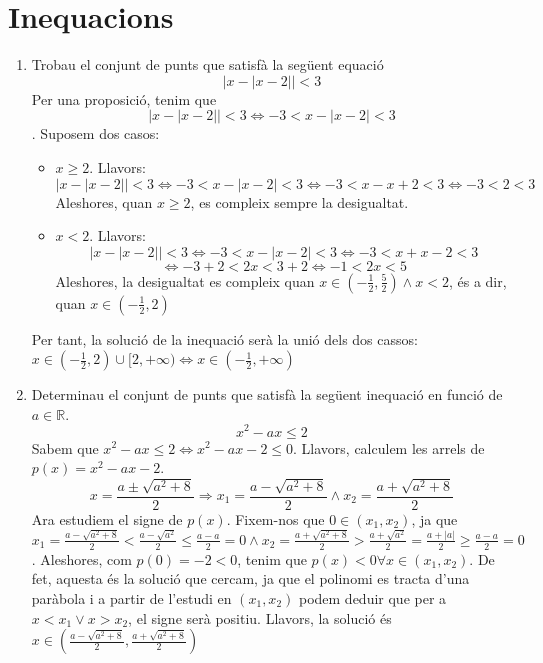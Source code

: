 
\section{Inequacions}
\begin{enumerate}
\item Trobau el conjunt de punts que satisfà la següent equació \begin{equation}
|x - |x-2|| < 3
\end{equation}
Per una proposició, tenim que $$|x - |x-2|| < 3 \Leftrightarrow - 3 < x - |x-2| < 3$$. Suposem dos casos:
\begin{itemize}
\item $x \geq 2$. Llavors: $$|x - |x-2|| < 3 \Leftrightarrow - 3 < x - |x-2| < 3 \Leftrightarrow - 3 < x - x + 2 < 3 \Leftrightarrow - 3 < 2 < 3$$ 
Aleshores, quan $x \geq 2$, es compleix sempre la desigualtat.
\item $x < 2$. Llavors: $$|x - |x-2|| < 3 \Leftrightarrow - 3 < x - |x-2| < 3 \Leftrightarrow - 3 < x +  x - 2 < 3 $$$$ \Leftrightarrow - 3 + 2 < 2x < 3 + 2 \Leftrightarrow -1 < 2x < 5$$
Aleshores, la desigualtat es compleix quan $x \in (- \frac{1}{2}, \frac{5}{2})\wedge x < 2$, és a dir, quan $x \in (- \frac{1}{2}, 2)$
\end{itemize}
Per tant, la solució de la inequació serà la unió dels dos cassos: $x \in (- \frac{1}{2}, 2) \cup [2, + \infty)\Leftrightarrow x \in (- \frac{1}{2}, + \infty)$
\item Determinau el conjunt de punts que satisfà la següent inequació en funció de $a \in \mathbb{R}$. 
\begin{equation}
x^2 - ax \leq 2
\end{equation}
Sabem que $x^2 - ax \leq 2 \Leftrightarrow x^2 - ax - 2 \leq 0$. Llavors, calculem les arrels de $p(x) = x^2 - ax - 2$.
$$x = \frac{a \pm \sqrt{a^2 + 8}}{2} \Rightarrow x_1 = \frac{a - \sqrt{a^2 + 8}}{2} \wedge x_2 = \frac{a + \sqrt{a^2 + 8}}{2}$$
Ara estudiem el signe de $p(x)$. Fixem-nos que $0 \in (x_1, x_2)$, ja que $x_1 = \frac{a - \sqrt{a^2 + 8}}{2} < \frac{a - \sqrt{a^2}}{2} \leq \frac{a - a}{2} = 0 \wedge x_2 = \frac{a + \sqrt{a^2 + 8}}{2} > \frac{a + \sqrt{a^2}}{2} = \frac{a + |a|}{2} \geq \frac{a - a}{2} = 0$. Aleshores, com $p(0) = -2 < 0$, tenim que $p(x) < 0 \forall x \in (x_1, x_2)$. De fet, aquesta és la solució que cercam, ja que el polinomi es tracta d'una paràbola i a partir de l'estudi en $(x_1, x_2)$ podem deduir que per a $x<x_1 \vee x > x_2$, el signe serà positiu. Llavors, la solució és $x \in (\frac{a - \sqrt{a^2 + 8}}{2}, \frac{a + \sqrt{a^2 + 8}}{2})$
\end{enumerate}